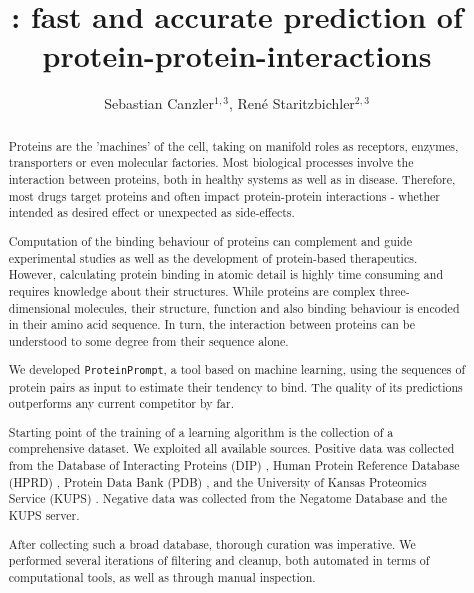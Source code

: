 \documentclass{article}
\title{\tool: fast and accurate prediction of protein-protein-interactions}
\author{ Sebastian Canzler$^{1,3}$, Ren\'{e} Staritzbichler$^{2,3}$}
\date{}
\newcommand{\tool}{\texttt{ProteinPrompt}}
\begin{document}
\maketitle

\vspace{-0.5cm}









\begin{samepage}

\begin{abstract}
  Proteins are the 'machines' of the cell, taking on manifold roles as receptors, enzymes, transporters or even molecular factories.
  Most biological processes involve the interaction between proteins, both in healthy systems as well as in disease.
  Therefore, most drugs target proteins and often impact protein-protein interactions - whether intended as desired effect or unexpected as side-effects.

  
  Computation of the binding behaviour of proteins can complement and guide experimental studies as well as the development of protein-based therapeutics.
  However, calculating protein binding in atomic detail is highly time consuming and requires  knowledge about their structures.
  While proteins are complex three-dimensional molecules, their structure, function and also binding behaviour is encoded in their amino acid sequence.
  In turn, the interaction between proteins can be understood to some degree from their sequence alone.
  
  We developed \tool, a tool based on machine learning, using the sequences of protein pairs as input to estimate their tendency to bind.
  The quality of its predictions outperforms any current competitor by far.
  
  Starting point of the training of a learning algorithm is the collection of a comprehensive dataset. We exploited all available sources.
  Positive data was collected from the
  Database of Interacting Proteins (DIP)
  \cite{Salwinski:2004},
  Human Protein Reference Database (HPRD)
  \cite{Keshava_Prasad:2009},
  Protein  Data Bank (PDB) \cite{Berman:2000}, and the University of Kansas Proteomics Service (KUPS) \cite{Chen:2011}.
  Negative data was collected from the Negatome Database \cite{Blohm:2014}  and the KUPS server.
  
  
  After collecting such a broad database, thorough curation was imperative.
  We performed several iterations of filtering and cleanup, both automated in terms of computational tools, as well as through manual inspection.
  

\end{abstract}
\end{samepage}
\end{document}
